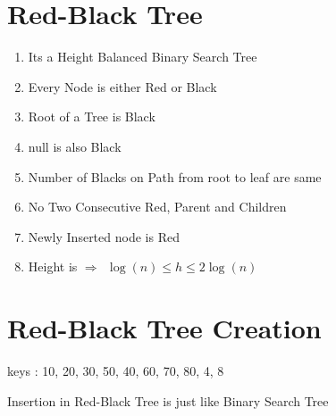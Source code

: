 \documentclass[12pt]{article}
\begin{document}
\tableofcontents

\newpage



\section{Red-Black Tree}


\begin{center}
\end{center}


\begin{enumerate}
	\item Its a Height Balanced Binary Search Tree
	\item Every Node is either Red or Black
	\item Root of a Tree is Black
	\item null is also Black
	\item Number of Blacks on Path from root to leaf are same
	\item No Two Consecutive Red, Parent and Children 
	\item Newly Inserted node is Red
	\item Height is $ \Rightarrow \:\: \log{(n)} \leq h \leq 2 \log{(n)}$
\end{enumerate}



\section{Red-Black Tree Creation}

keys : 10, 20, 30, 50, 40, 60, 70, 80, 4, 8


\begin{tcolorbox}
Insertion in Red-Black Tree is just like Binary Search Tree
\end{tcolorbox}
\end{document}
